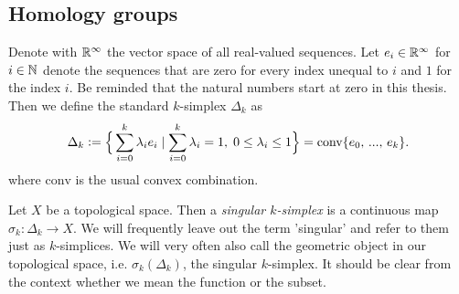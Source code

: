 \documentclass[../master_thesis.tex]{subfiles}
\begin{document}
\subsection{Homology groups}

Denote with $\mathbb{R}^\infty$ the vector space of all real-valued sequences. Let 
$e_i \in \mathbb{R}^\infty$ for $i \in \mathbb{N}$ denote the sequences 
that are zero for every index 
unequal to $i$ and $1$ for the index $i$. Be reminded that 
the natural numbers start at zero in this thesis. Then we define the standard $k$-simplex 
$\Delta_k$ as
\begin{align*}
    \Delta_k \vcentcolon= \Big\{ \sum\limits_{i=0}^k  \lambda_i e_i \mid 
    \sum\limits_{i=0}^k \lambda_i = 1 , \; 0\leq \lambda_i \leq 1\Big\}
    = \text{conv} \{e_0,\,...,\, e_k\}.
\end{align*}
where $\text{conv}$ is the usual convex combination. 

\begin{definition}[$k$-simplex]
    Let $X$ be a topological space. Then a \textit{singular $k$-simplex} is a continuous 
    map $\sigma_k: \Delta_k \rightarrow X$. We will frequently leave out the term 'singular'
    and refer to them just as $k$-simplices. We will very often also call 
    the geometric object in our topological space, i.e. $\sigma_k(\Delta_k)$,
    the singular $k$-simplex. It should be clear from the context whether we mean 
    the function or the subset.
\end{definition}

\end{document}
